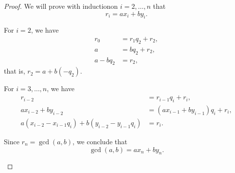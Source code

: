 \begin{proof}
  We will prove with induction\IND on \( i = 2, \ldots, n \) that
  \begin{equation*}
    r_i = ax_i + by_i.
  \end{equation*}

  \begin{algenum}
     For \( i = 2 \), we have
    \begin{align*}
      r_0 &= r_1 q_2 + r_2, \\
      a &= b q_2 + r_2, \\
      a - b q_2 &= r_2,
    \end{align*}
    that is, \( r_2 = a + b (-q_2) \).

     For \( i = 3, \ldots, n \), we have
    \begin{align*}
      r_{i-2} &= r_{i-1} q_i + r_i, \\
      a x_{i-2} + b y_{i-2} &= (a x_{i-1} + b y_{i-1}) q_i + r_i, \\
      a (x_{i-2} - x_{i-1} q_i) + b (y_{i-2} - y_{i-1} q_i) &= r_i.
    \end{align*}

     Since \( r_n = \gcd(a, b) \), we conclude that
    \begin{equation*}
      \gcd(a, b) = a x_n + b y_n.
    \end{equation*}
  \end{algenum}
\end{proof}
